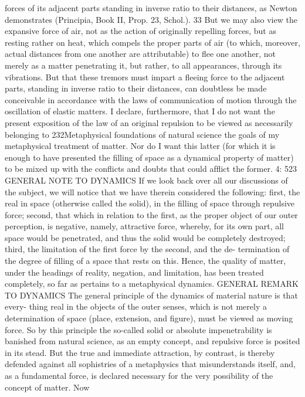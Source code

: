 forces of its adjacent parts standing in inverse ratio to their distances,
as Newton demonstrates (Principia, Book II, Prop. 23, Schol.). 33 But we
may also view the expansive force of air, not as the action of originally
repelling forces, but as resting rather on heat, which compels the proper
parts of air (to which, moreover, actual distances from one another are
attributable) to ﬂee one another, not merely as a matter penetrating it, but
rather, to all appearances, through its vibrations. But that these tremors
must impart a ﬂeeing force to the adjacent parts, standing in inverse ratio
to their distances, can doubtless be made conceivable in accordance with
the laws of communication of motion through the oscillation of elastic
matters.
I declare, furthermore, that I do not want the present exposition of
the law of an original repulsion to be viewed as necessarily belonging to
232Metaphysical foundations of natural science
the goals of my metaphysical treatment of matter. Nor do I want this
latter (for which it is enough to have presented the ﬁlling of space as
a dynamical property of matter) to be mixed up with the conﬂicts and
doubts that could afﬂict the former.
4: 523
GENERAL NOTE TO DYNAMICS
If we look back over all our discussions of the subject, we will notice
that we have therein considered the following: ﬁrst, the real in space
(otherwise called the solid), in the ﬁlling of space through repulsive force;
second, that which in relation to the ﬁrst, as the proper object of our outer
perception, is negative, namely, attractive force, whereby, for its own part,
all space would be penetrated, and thus the solid would be completely
destroyed; third, the limitation of the ﬁrst force by the second, and the de-
termination of the degree of ﬁlling of a space that rests on this. Hence, the
quality of matter, under the headings of reality, negation, and limitation, has
been treated completely, so far as pertains to a metaphysical dynamics.
GENERAL REMARK TO DYNAMICS
The general principle of the dynamics of material nature is that every-
thing real in the objects of the outer senses, which is not merely a
determination of space (place, extension, and ﬁgure), must be viewed
as moving force. So by this principle the so-called solid or absolute
impenetrability is banished from natural science, as an empty concept,
and repulsive force is posited in its stead. But the true and immediate
attraction, by contrast, is thereby defended against all sophistries of a
metaphysics that misunderstands itself, and, as a fundamental force, is
declared necessary for the very possibility of the concept of matter. Now
